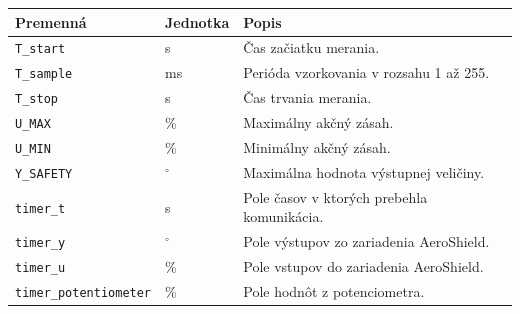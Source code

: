 \documentclass[a4paper, 10pt, ]{article}
\begin{document}
\begin{center}

    \vspace{-10pt}

    \label{tab:quick_desc}

    \lstyle

    \begin{tabular*}{\textwidth}{@{ \extracolsep{\fill}} ll|l}
        \toprule
        Premenná & Jednotka & Popis \\
        \midrule
        \texttt{T\_start} & s & Čas začiatku merania. \\
        \texttt{T\_sample} & ms & Perióda vzorkovania v rozsahu 1 až 255. \\
        \texttt{T\_stop} & s & Čas trvania merania. \\
        \texttt{U\_MAX} & \% & Maximálny akčný zásah. \\
        \texttt{U\_MIN} & \% & Minimálny akčný zásah. \\
        \texttt{Y\_SAFETY} & $^\circ$ & Maximálna hodnota výstupnej veličiny. \\
        \texttt{timer\_t} & s & Pole časov v ktorých prebehla komunikácia. \\
        \texttt{timer\_y} & $^\circ$ & Pole výstupov zo zariadenia AeroShield. \\
        \texttt{timer\_u} & \% & Pole vstupov do zariadenia AeroShield. \\
        \texttt{timer\_potentiometer} & \% & Pole hodnôt z potenciometra. \\
        \bottomrule
    \end{tabular*}
\end{center}

\newpage
\end{document}
